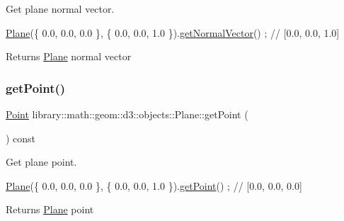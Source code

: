Get plane normal vector. 


\begin{DoxyCode}
\hyperlink{classlibrary_1_1math_1_1geom_1_1d3_1_1objects_1_1_plane_a81fe78a983e2cb6ee6ad9bfabd22c3a4}{Plane}(\{ 0.0, 0.0, 0.0 \}, \{ 0.0, 0.0, 1.0 \}).\hyperlink{classlibrary_1_1math_1_1geom_1_1d3_1_1objects_1_1_plane_a9d34608a389d4c80dad6b6f58b82c0e4}{getNormalVector}() ; \textcolor{comment}{// [0.0, 0.0, 1.0]}
\end{DoxyCode}


\begin{DoxyReturn}{Returns}
\hyperlink{classlibrary_1_1math_1_1geom_1_1d3_1_1objects_1_1_plane}{Plane} normal vector 
\end{DoxyReturn}
\mbox{\label{classlibrary_1_1math_1_1geom_1_1d3_1_1objects_1_1_plane_a52f9167ca123019c4b303c19b696b886}} 
\subsubsection{\texorpdfstring{get\+Point()}{getPoint()}}
{\footnotesize\ttfamily \hyperlink{classlibrary_1_1math_1_1geom_1_1d3_1_1objects_1_1_point}{Point} library\+::math\+::geom\+::d3\+::objects\+::\+Plane\+::get\+Point (\begin{DoxyParamCaption}{ }\end{DoxyParamCaption}) const}



Get plane point. 


\begin{DoxyCode}
\hyperlink{classlibrary_1_1math_1_1geom_1_1d3_1_1objects_1_1_plane_a81fe78a983e2cb6ee6ad9bfabd22c3a4}{Plane}(\{ 0.0, 0.0, 0.0 \}, \{ 0.0, 0.0, 1.0 \}).\hyperlink{classlibrary_1_1math_1_1geom_1_1d3_1_1objects_1_1_plane_a52f9167ca123019c4b303c19b696b886}{getPoint}() ; \textcolor{comment}{// [0.0, 0.0, 0.0]}
\end{DoxyCode}


\begin{DoxyReturn}{Returns}
\hyperlink{classlibrary_1_1math_1_1geom_1_1d3_1_1objects_1_1_plane}{Plane} point 
\end{DoxyReturn}
\mbox{\label{classlibrary_1_1math_1_1geom_1_1d3_1_1objects_1_1_plane_a151515bf70e661c008023672e716e10a}} 
